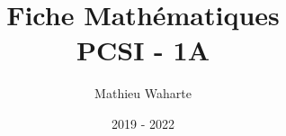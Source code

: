 \documentclass[12 pt]{book}
\title{Fiche Mathématiques \\ PCSI - 1A}
\author{Mathieu Waharte}
\date{2019 - 2022}
\begin{document}
\maketitle
\newpage

\newcommand{\mA}{\mathcal{A}}
\newcommand{\mB}{\mathcal{B}}
\newcommand{\mC}{\mathcal{C}}
\newcommand{\mD}{\mathcal{D}}
\newcommand{\mE}{\mathcal{E}}
\newcommand{\mF}{\mathcal{F}}
\newcommand{\mG}{\mathcal{G}}
\newcommand{\mH}{\mathcal{H}}
\newcommand{\mI}{\mathcal{I}}
\newcommand{\mJ}{\mathcal{J}}
\newcommand{\mK}{\mathcal{K}}
\newcommand{\mL}{\mathcal{L}}
\newcommand{\mM}{\mathcal{M}}
\newcommand{\mN}{\mathcal{N}}
\newcommand{\mO}{\mathcal{O}}
\newcommand{\mP}{\mathcal{P}}
\newcommand{\mQ}{\mathcal{Q}}
\newcommand{\mR}{\mathcal{R}}
\newcommand{\mS}{\mathcal{S}}
\newcommand{\mT}{\mathcal{T}}
\newcommand{\mU}{\mathcal{U}}
\newcommand{\mV}{\mathcal{V}}
\newcommand{\mW}{\mathcal{W}}
\newcommand{\mX}{\mathcal{X}}
\newcommand{\mY}{\mathcal{Y}}
\newcommand{\mZ}{\mathcal{Z}}

\newcommand{\R}{\mathbb{R}}
\newcommand{\N}{\mathbb{N}}
\newcommand{\C}{\mathbb{C}}
\newcommand{\Z}{\mathbb{Z}}
\newcommand{\U}{\mathbb{U}}
\newcommand{\D}{\mathbb{D}}
\newcommand{\K}{\mathbb{K}}
\newcommand{\bP}{\mathbb{P}}
\newcommand{\E}{\mathbb{E}}
\newcommand{\V}{\mathbb{V}}

\newcommand{\sA}{\mathscr{A}}
\newcommand{\sB}{\mathscr{B}}
\newcommand{\sC}{\mathscr{C}}
\newcommand{\sD}{\mathscr{D}}
\newcommand{\sE}{\mathscr{E}}
\newcommand{\sF}{\mathscr{F}}
\newcommand{\sG}{\mathscr{G}}
\newcommand{\sH}{\mathscr{H}}
\newcommand{\sI}{\mathscr{I}}
\newcommand{\sJ}{\mathscr{J}}
\newcommand{\sK}{\mathscr{K}}
\newcommand{\sL}{\mathscr{L}}
\newcommand{\sM}{\mathscr{M}}
\newcommand{\sN}{\mathscr{N}}
\newcommand{\sO}{\mathscr{O}}
\newcommand{\sP}{\mathscr{P}}
\newcommand{\sQ}{\mathscr{Q}}
\newcommand{\sR}{\mathscr{R}}
\newcommand{\sS}{\mathscr{S}}
\newcommand{\sT}{\mathscr{T}}
\newcommand{\sU}{\mathscr{U}}
\newcommand{\sV}{\mathscr{V}}
\newcommand{\sW}{\mathscr{W}}
\newcommand{\sX}{\mathscr{X}}
\newcommand{\sY}{\mathscr{Y}}
\newcommand{\sZ}{\mathscr{Z}}

\newcommand{\Mat}{\text{Mat}}

\newcommand{\Ra}{\Rightarrow}
\newcommand{\ra}{\rightarrow}
\newcommand{\La}{\Leftarrow}
\newcommand{\la}{\leftarrow}
\newcommand{\Da}{\Leftrightarrow}
\newcommand{\da}{\leftrightarrow}

\newcommand{\0}{\emptyset}
\newcommand{\bigzero}{\mbox{\normalfont\Large\bfseries 0}}
\newcommand{\rvline}{\hspace*{-\arraycolsep}\vline\hspace*{-\arraycolsep}}
\newcommand\restr[2]{{%
  \left.\kern-\nulldelimiterspace %
  #1 %
  \vphantom{\big|} %
  \right|_{#2} %
  }}
\end{document}
